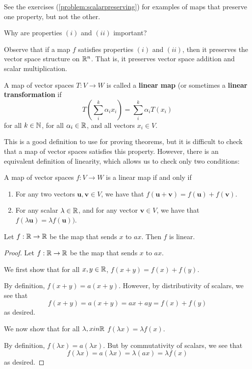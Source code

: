 See the exercises (\ref{problem:scalarpreserving}) for examples of maps that preserve one property, but not the other.

\begin{motivating}
Why are properties $(i)$ and $(ii)$ important?
\end{motivating}

Observe that if a map $f$ satisfies properties $(i)$ and $(ii)$, then it preserves the vector space structure on $\mathbb{R}^n$.  That is, it preserves vector space addition and scalar multiplication.


\begin{definition}\label{def:linearmap}
A map of vector spaces $T : V \to W$ is called a \textbf{linear map} (or sometimes a \textbf{linear transformation} if $$T \left(\sum_i^k \alpha_i x_i\right) = \sum_i^k \alpha_i T(x_i)$$
for all $k \in \mathbb{N}$, for all $\alpha_i \in \mathbb{R}$, and all vectors $x_i \in V$.
\end{definition}

This is a good definition to use for proving theorems, but it is difficult to check that a map of vector spaces satisfies this property.  However, there is an equivalent definition of linearity, which allows us to check only two conditions:

\begin{proposition}
A map of vector spaces $f: V \to W$ is a linear map if and only if 

\begin{enumerate}[label=(\roman*)]
        \item For any two vectors $\bm{u}, \bm{v} \in V$, we have that $f(\bm{u}+ \bm{v}) = f(\bm{u}) + f(\bm{v})$.
        \item For any scalar $\lambda \in \mathbb{R}$, and for any vector $\bm{v} \in V$, we have that $f(\lambda \bm{u}) = \lambda f(\bm{u}))$.
    \end{enumerate}
\end{proposition}

\begin{example}\label{multbyaislinear}
    Let $f: \mathbb{R} \to \mathbb{R}$ be the map that sends $x$ to $ax$. Then $f$ is linear.

    \begin{proof}
    Let $f: \mathbb{R} \to \mathbb{R}$ be the map that sends $x$ to $ax$.
    
    We first show that for all $x, y \in \mathbb{R}$, $f(x+y) = f(x) + f(y)$.

    By definition, $f(x+y) = a(x+y)$.  However, by distributivity of scalars, we see that 
    $$f(x+y)= a(x+y) = ax+ay = f(x) + f(y)$$
     as desired.

     We now show that for all $\lambda, x in \mathbb{R}$ $f(\lambda x) = \lambda f(x)$.

     By definition, $f(\lambda x) = a(\lambda x)$.  But by commutativity of scalars, we see that 
     $$f(\lambda x) = a(\lambda x) = \lambda (ax) = \lambda f(x)$$ as desired.
     
    \end{proof}
    
\end{example}

